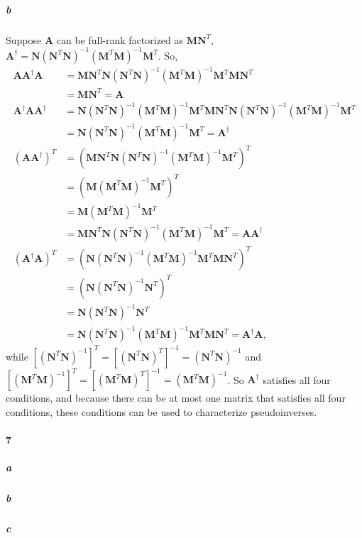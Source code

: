 \documentclass[22pt]{article}
\begin{document}
		\subparagraph{b}Suppose $\mathbf{A}$ can be full-rank factorized as $\mathbf{MN}^T$, $\mathbf{A}^\dagger = \mathbf{N}(\mathbf{N}^T\mathbf{N})^{-1}(\mathbf{M}^T\mathbf{M})^{-1}\mathbf{M}^T$. So,
		\begin{align}
			\mathbf{AA}^\dagger\mathbf{A} & = \mathbf{MN}^T\mathbf{N}(\mathbf{N}^T\mathbf{N})^{-1}(\mathbf{M}^T\mathbf{M})^{-1}\mathbf{M}^T\mathbf{MN}^T\\
			& = \mathbf{MN}^T = \mathbf{A}\\
			\mathbf{A}^\dagger\mathbf{AA}^\dagger & = \mathbf{N}(\mathbf{N}^T\mathbf{N})^{-1}(\mathbf{M}^T\mathbf{M})^{-1}\mathbf{M}^T\mathbf{MN}^T\mathbf{N}(\mathbf{N}^T\mathbf{N})^{-1}(\mathbf{M}^T\mathbf{M})^{-1}\mathbf{M}^T\\
			& =  \mathbf{N}(\mathbf{N}^T\mathbf{N})^{-1}(\mathbf{M}^T\mathbf{M})^{-1}\mathbf{M}^T = \mathbf{A}^\dagger\\
			(\mathbf{AA}^\dagger)^T & = (\mathbf{MN}^T\mathbf{N}(\mathbf{N}^T\mathbf{N})^{-1}(\mathbf{M}^T\mathbf{M})^{-1}\mathbf{M}^T)^T\\
			& = (\mathbf{M}(\mathbf{M}^T\mathbf{M})^{-1}\mathbf{M}^T)^T\\
			& = \mathbf{M}(\mathbf{M}^T\mathbf{M})^{-1}\mathbf{M}^T\\
			& = \mathbf{MN}^T\mathbf{N}(\mathbf{N}^T\mathbf{N})^{-1}(\mathbf{M}^T\mathbf{M})^{-1}\mathbf{M}^T = \mathbf{AA}^\dagger\\
			(\mathbf{A}^\dagger\mathbf{A})^T & = (\mathbf{N}(\mathbf{N}^T\mathbf{N})^{-1}(\mathbf{M}^T\mathbf{M})^{-1}\mathbf{M}^T\mathbf{MN}^T)^T\\
			& = (\mathbf{N}(\mathbf{N}^T\mathbf{N})^{-1}\mathbf{N}^T)^T\\
			& = \mathbf{N}(\mathbf{N}^T\mathbf{N})^{-1}\mathbf{N}^T\\
			& = \mathbf{N}(\mathbf{N}^T\mathbf{N})^{-1}(\mathbf{M}^T\mathbf{M})^{-1}\mathbf{M}^T\mathbf{MN}^T = \mathbf{A}^\dagger\mathbf{A},
		\end{align}
		while $[(\mathbf{N}^T\mathbf{N})^{-1}]^T=[(\mathbf{N}^T\mathbf{N})^{T}]^{-1} = (\mathbf{N}^T\mathbf{N})^{-1}$ and $[(\mathbf{M}^T\mathbf{M})^{-1}]^T =[(\mathbf{M}^T\mathbf{M})^{T}]^{-1}= (\mathbf{M}^T\mathbf{M})^{-1}$.
		So $\mathbf{A}^\dagger$ satisfies all four conditions, and because there can be at most one matrix that satisfies all four conditions, these conditions can be used to characterize pseudoinverses.


	\paragraph{7}
		\subparagraph{a}

		\subparagraph{b}

		\subparagraph{c}
\end{document}
